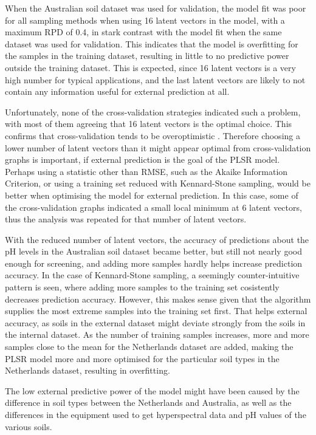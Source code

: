 \documentclass{isprs}
\begin{document}
When the Australian soil dataset was used for validation, the model fit was poor for all sampling methods when using 16 latent vectors in the model, with a maximum RPD of 0.4, in stark contrast with the model fit when the same dataset was used for validation. This indicates that the model is overfitting for the samples in the training dataset, resulting in little to no predictive power outside the training dataset. This is expected, since 16 latent vectors is a very high number for typical applications, and the last latent vectors are likely to not contain any information useful for external prediction at all.

Unfortunately, none of the cross-validation strategies indicated such a problem, with most of them agreeing that 16 latent vectors is the optimal choice. This confirms that cross-validation tends to be overoptimistic \cite{clark2003boosted}. Therefore choosing a lower number of latent vectors than it might appear optimal from cross-validation graphs is important, if external prediction is the goal of the PLSR model. Perhaps using a statistic other than RMSE, such as the Akaike Information Criterion, or using a training set reduced with Kennard-Stone sampling, would be better when optimising the model for external prediction. In this case, some of the cross-validation graphs indicated a small local minimum at 6 latent vectors, thus the analysis was repeated for that number of latent vectors.

With the reduced number of latent vectors, the accuracy of predictions about the pH levels in the Australian soil dataset became better, but still not nearly good enough for screening, and adding more samples hardly helps increase prediction accuracy. In the case of Kennard-Stone sampling, a seemingly counter-intuitive pattern is seen, where adding more samples to the training set cosistently decreases prediction accuracy. However, this makes sense given that the algorithm supplies the most extreme samples into the training set first. That helps external accuracy, as soils in the external dataset might deviate strongly from the soils in the internal dataset. As the number of training samples increases, more and more samples close to the mean for the Netherlands dataset are added, making the PLSR model more and more optimised for the particular soil types in the Netherlands dataset, resulting in overfitting.

The low external predictive power of the model might have been caused by the difference in soil types between the Netherlands and Australia, as well as the differences in the equipment used to get hyperspectral data and pH values of the various soils.
\end{document}
